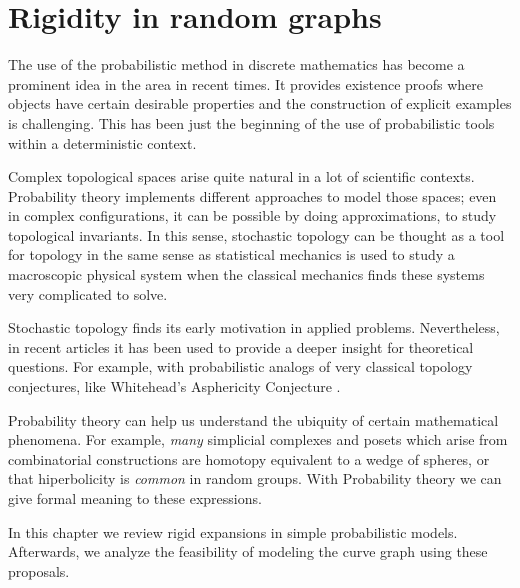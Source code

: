 
\chapter{Rigidity in random graphs} %

\label{Chapter2} %



The use of the probabilistic method in discrete mathematics has become a prominent idea in the area in recent times. It provides existence proofs where objects have certain desirable properties and the construction of explicit examples is challenging. This has been just the beginning of the use of probabilistic tools within a deterministic context.

Complex topological spaces arise quite natural in a lot of scientific contexts. Probability theory implements different approaches to model those spaces; even in complex configurations, it can be possible by doing approximations, to study topological invariants. In this sense, stochastic topology can be thought as a tool for topology in the same sense as statistical mechanics is used to study a macroscopic physical system when the classical mechanics finds these systems very complicated to solve. 

Stochastic topology finds its early motivation in applied problems. Nevertheless, in recent articles it has been used to provide a deeper insight for theoretical questions. For example, with probabilistic analogs of very classical topology conjectures, like Whitehead's Asphericity Conjecture \cite[Costa, Faber 15]{Costa15}.

Probability theory can help us understand the ubiquity of certain mathematical phenomena. For example, \textit{many} simplicial complexes and posets which arise from combinatorial constructions are homotopy equivalent to a wedge of spheres, or that hiperbolicity is \textit{common} in random groups. With Probability theory we can give formal meaning to these expressions.

In this chapter we review rigid expansions in simple probabilistic models. Afterwards, we analyze the feasibility of modeling the curve graph using these proposals.

